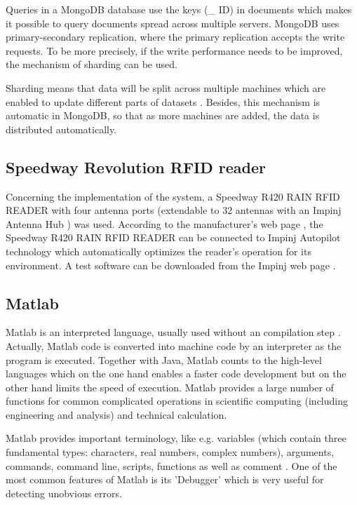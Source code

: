 Queries in a MongoDB database use the keys ({\_} ID) in documents which makes it possible to query documents spread across multiple servers. 
MongoDB uses primary-secondary replication, where the primary replication accepts the write requests. To be more precisely, if the write performance needs to be improved, the mechanism of sharding can be used. 

Sharding means that data will be split across multiple machines which are enabled to update different parts of datasets \cite[p.25 ff.]{mongodb_edward}. Besides, this mechanism is automatic in MongoDB, so that as more machines are added, the data is distributed automatically.

\subsection{Speedway Revolution RFID reader}

Concerning the implementation of the system, a Speedway R420 RAIN RFID READER \cite{speedway} with four antenna ports (extendable to 32 antennas with an Impinj Antenna Hub \cite{speedway}) was used. According to the manufacturer's web page \cite{speedway}, the Speedway R420 RAIN RFID READER can be connected to Impinj Autopilot technology which automatically optimizes the reader's operation for its environment. A test software can be downloaded from the Impinj web page  \cite{speedway}.

\subsection{Matlab}

Matlab is an interpreted language, usually used without an compilation step \cite[lesson 1]{introduction_matlab}. Actually, Matlab code is converted into machine code by an interpreter as the program is executed. Together with Java, Matlab counts to the high-level languages which on the one hand enables a faster code development but on the other hand limits the speed of execution. Matlab provides a large number of functions for common complicated operations in scientific computing (including engineering and analysis) and technical calculation.

Matlab provides important terminology, like e.g. variables (which contain three fundamental types: characters, real numbers, complex numbers), arguments, commands, command line, scripts, functions as well as comment \cite[lesson 1]{introduction_matlab}. 
One of the most common features of Matlab is its 'Debugger' \cite[lesson 8]{introduction_matlab} which is very useful for detecting unobvious errors.

